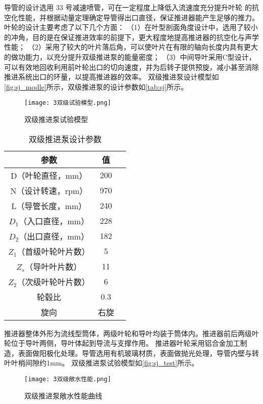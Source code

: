 导管的设计选用 33 号减速喷管，可在一定程度上降低入流速度充分提升叶轮
的抗空化性能，并根据动量定理确定导管得出口直径，保证推进器能产生足够的推力。
叶轮的设计主要考虑了以下几个方面：
（1）在叶型剖面角度设计中，选用了较小的冲角，目的是在保证推进效率的前提下，更大程度地提高推进器的抗空化与声学性能；
（2）采用了较大的叶片落后角，可以使叶片在有限的轴向长度内具有更大的做功能力，以充分提升双级推进泵的能量密度；
（3）中间导叶采用C型设计，可以有效地回收利用前叶轮出口的切向速度，并为后转子提供预旋，减小甚至消除推进系统出口的环量，以提高推进器的效率。
双级推进泵设计模型如\autoref{fig:sj_modle}所示，双级推进泵的设计参数如\autoref{tab:sj}所示。
\begin{figure}[htbp]
    \centering
    \texttt{[image: 3双级试验模型.png]}
    \caption{\label{fig:sj_test}双级推进泵试验模型}
\end{figure}

\begin{table}[htbp]
    \centering
    \caption{\label{tab:sj}双级推进泵设计参数}
    \begin{tabular}{ccc}
     \toprule
     参数&值\\
     \midrule
     D（叶轮直径，mm）&200\\
     N（设计转速，rpm）&970\\
     L（导管长度，mm）&240\\
     $D_1$（入口直径，mm）&228\\
     $D_2$（出口直径，mm）&182\\
     $Z_1$（首级叶轮叶片数）&5\\
     $Z_s$（导叶叶片数）&11\\
     $Z_2$（次级叶轮叶片数）&6\\
     轮毂比&0.3\\
     旋向&右旋\\
     \bottomrule
    \end{tabular}
\end{table}

推进器整体外形为流线型筒体，两级叶轮和导叶均装于筒体内。推进器前后两级叶轮位于导叶两侧，导叶体起到导流与支撑作用。
推进器叶轮采用铝合金加工制造，表面做阳极化处理。导管选用有机玻璃材质，表面做抛光处理，导管内壁与转叶叶梢间隙约1mm。
双级推进泵试验模型如\autoref{fig:sj_test}所示。
\begin{figure}[htbp]
    \centering
    \texttt{[image: 3双级敞水性能.png]}
    \caption{\label{fig:sj_changshui}双级推进泵敞水性能曲线}
\end{figure}

